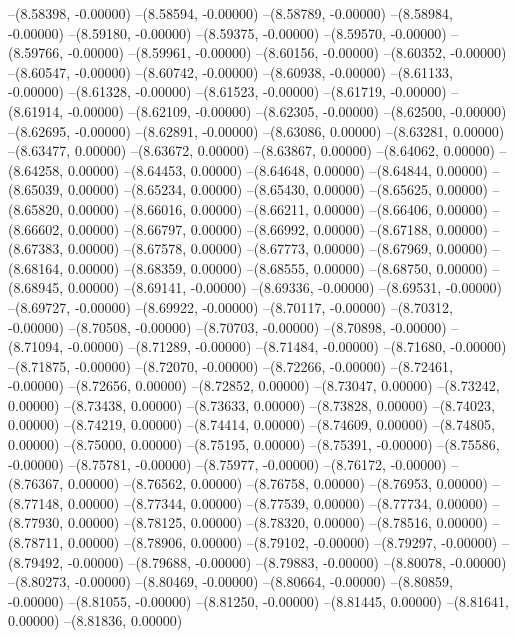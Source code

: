 --(8.58398, -0.00000)
--(8.58594, -0.00000)
--(8.58789, -0.00000)
--(8.58984, -0.00000)
--(8.59180, -0.00000)
--(8.59375, -0.00000)
--(8.59570, -0.00000)
--(8.59766, -0.00000)
--(8.59961, -0.00000)
--(8.60156, -0.00000)
--(8.60352, -0.00000)
--(8.60547, -0.00000)
--(8.60742, -0.00000)
--(8.60938, -0.00000)
--(8.61133, -0.00000)
--(8.61328, -0.00000)
--(8.61523, -0.00000)
--(8.61719, -0.00000)
--(8.61914, -0.00000)
--(8.62109, -0.00000)
--(8.62305, -0.00000)
--(8.62500, -0.00000)
--(8.62695, -0.00000)
--(8.62891, -0.00000)
--(8.63086, 0.00000)
--(8.63281, 0.00000)
--(8.63477, 0.00000)
--(8.63672, 0.00000)
--(8.63867, 0.00000)
--(8.64062, 0.00000)
--(8.64258, 0.00000)
--(8.64453, 0.00000)
--(8.64648, 0.00000)
--(8.64844, 0.00000)
--(8.65039, 0.00000)
--(8.65234, 0.00000)
--(8.65430, 0.00000)
--(8.65625, 0.00000)
--(8.65820, 0.00000)
--(8.66016, 0.00000)
--(8.66211, 0.00000)
--(8.66406, 0.00000)
--(8.66602, 0.00000)
--(8.66797, 0.00000)
--(8.66992, 0.00000)
--(8.67188, 0.00000)
--(8.67383, 0.00000)
--(8.67578, 0.00000)
--(8.67773, 0.00000)
--(8.67969, 0.00000)
--(8.68164, 0.00000)
--(8.68359, 0.00000)
--(8.68555, 0.00000)
--(8.68750, 0.00000)
--(8.68945, 0.00000)
--(8.69141, -0.00000)
--(8.69336, -0.00000)
--(8.69531, -0.00000)
--(8.69727, -0.00000)
--(8.69922, -0.00000)
--(8.70117, -0.00000)
--(8.70312, -0.00000)
--(8.70508, -0.00000)
--(8.70703, -0.00000)
--(8.70898, -0.00000)
--(8.71094, -0.00000)
--(8.71289, -0.00000)
--(8.71484, -0.00000)
--(8.71680, -0.00000)
--(8.71875, -0.00000)
--(8.72070, -0.00000)
--(8.72266, -0.00000)
--(8.72461, -0.00000)
--(8.72656, 0.00000)
--(8.72852, 0.00000)
--(8.73047, 0.00000)
--(8.73242, 0.00000)
--(8.73438, 0.00000)
--(8.73633, 0.00000)
--(8.73828, 0.00000)
--(8.74023, 0.00000)
--(8.74219, 0.00000)
--(8.74414, 0.00000)
--(8.74609, 0.00000)
--(8.74805, 0.00000)
--(8.75000, 0.00000)
--(8.75195, 0.00000)
--(8.75391, -0.00000)
--(8.75586, -0.00000)
--(8.75781, -0.00000)
--(8.75977, -0.00000)
--(8.76172, -0.00000)
--(8.76367, 0.00000)
--(8.76562, 0.00000)
--(8.76758, 0.00000)
--(8.76953, 0.00000)
--(8.77148, 0.00000)
--(8.77344, 0.00000)
--(8.77539, 0.00000)
--(8.77734, 0.00000)
--(8.77930, 0.00000)
--(8.78125, 0.00000)
--(8.78320, 0.00000)
--(8.78516, 0.00000)
--(8.78711, 0.00000)
--(8.78906, 0.00000)
--(8.79102, -0.00000)
--(8.79297, -0.00000)
--(8.79492, -0.00000)
--(8.79688, -0.00000)
--(8.79883, -0.00000)
--(8.80078, -0.00000)
--(8.80273, -0.00000)
--(8.80469, -0.00000)
--(8.80664, -0.00000)
--(8.80859, -0.00000)
--(8.81055, -0.00000)
--(8.81250, -0.00000)
--(8.81445, 0.00000)
--(8.81641, 0.00000)
--(8.81836, 0.00000)
